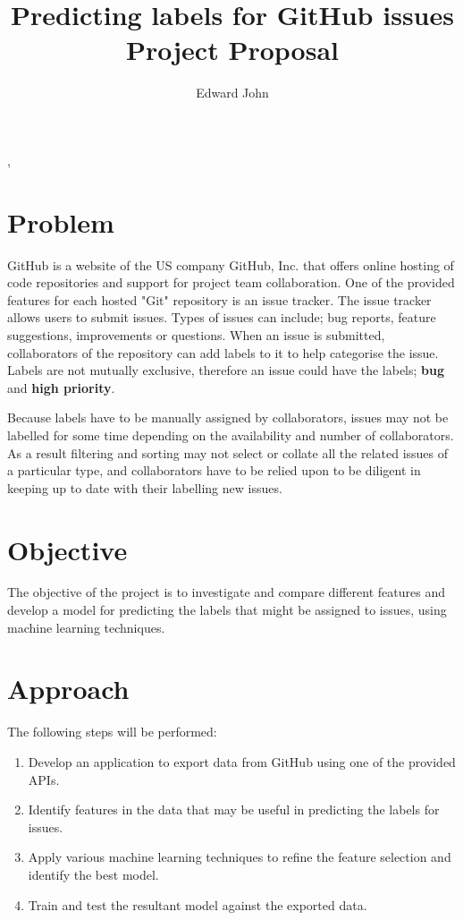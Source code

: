 \documentclass{article}
\title{Predicting labels for GitHub issues \\ Project Proposal}
\author{Edward John}
\begin{document}
\newcommand{\mycite}[1]{\textsuperscript{\cite{#1}}}

\begin{huge}
\noindent
\makeatletter
\@title \par
\makeatother
\end{huge}
\vspace{1em}
\begin{large}
\noindent
\makeatletter
\@author, \@date
\makeatother
\end{large}

\begin{multicols}{2}
\section*{Problem}
GitHub is a website of the US company GitHub, Inc. that offers online hosting of code repositories and support for project team collaboration. One of the provided features for each hosted "Git" repository is an issue tracker. The issue tracker allows users to submit issues. Types of issues can include; bug reports, feature suggestions, improvements or questions. When an issue is submitted, collaborators of the repository can add labels to it to help categorise the issue. Labels are not mutually exclusive, therefore an issue could have the labels; \textbf{bug} and \textbf{high priority}.

Because labels have to be manually assigned by collaborators, issues may not be labelled for some time depending on the availability and number of collaborators. As a result filtering and sorting may not select or collate all the related issues of a particular type, and collaborators have to be relied upon to be diligent in keeping up to date with their labelling new issues.

\section*{Objective}
The objective of the project is to investigate and compare different features and develop a model for predicting the labels that might be assigned to issues, using machine learning techniques.

\section*{Approach}
The following steps will be performed:
\begin{enumerate}
\item Develop an application to export data from GitHub using one of the provided APIs.
\item Identify features in the data that may be useful in predicting the labels for issues.
\item Apply various machine learning techniques to refine the feature selection and identify the best model.
\item Train and test the resultant model against the exported data.
\end{enumerate}


\end{multicols}
\end{document}
